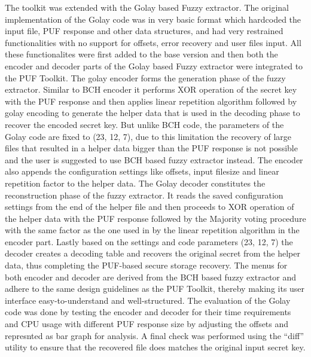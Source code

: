 The toolkit was extended with the Golay based Fuzzy extractor. The original implementation of the Golay code was in very basic format which hardcoded the input file, PUF response and other data structures, and had very restrained functionalities with no support for offsets, error recovery and user files input. All these functionalites were first added to the base version and then both the encoder and decoder parts of the Golay based Fuzzy extractor were integrated to the PUF Toolkit. The
golay encoder forms the generation phase of the fuzzy extractor. Similar to BCH encoder it performs XOR operation of the secret key with the PUF response and then applies linear repetition algorithm followed by golay encoding to generate the helper data that is used in the decoding phase to recover the encoded secret key. But unlike BCH code, the parameters of the Golay code are fixed to (23, 12, 7), due to this limitation the recovery of large files that resulted in a helper data bigger than
the PUF response is not possible and the user is suggested to use BCH based fuzzy extractor instead. The encoder also appends the configuration settings like offsets, input filesize and linear repetition factor to the helper data. The Golay decoder constitutes the reconstruction phase of the fuzzy extractor. It reads the saved configuration settings from the end of the helper file and then proceeds to XOR operation of the helper
data with the PUF response followed by the Majority voting procedure with the same factor as the one used in by the linear repetition algorithm in the encoder part. Lastly based on the settings and code parameters (23, 12, 7) the decoder creates a decoding table and recovers the original secret from the helper data, thus completing the PUF-based secure storage recovery. The menus for both encoder and decoder are derived from the BCH based fuzzy extractor and
adhere to the same design guidelines as the PUF Toolkit, thereby making its user interface easy-to-understand and well-structured. The evaluation of the Golay code was done by testing the encoder and decoder for their time requirements and CPU usage with different PUF response size by adjusting the offsets and represnted as bar graph for analysis. A final check was performed using the ``diff'' utility to ensure that the recovered file does matches the original input secret key.

